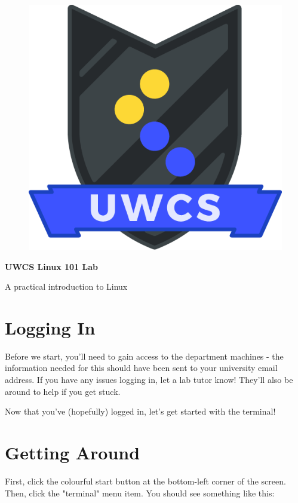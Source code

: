 \documentclass[a4paper,11pt,parskip=half-]{scrartcl}
\begin{document}
\begin{figure}
    \vspace{-10pt} %
    \includegraphics[width=0.9\linewidth]{shield.png}
    \vspace{-100pt} %
\end{figure}

\normalfont \Huge \bfseries UWCS Linux 101 Lab

\normalfont\LARGE A practical introduction to Linux
\normalsize

\section*{Logging In}

Before we start, you'll need to gain access to the department machines - the information needed for this should have been sent to your university email address. 
If you have any issues logging in, let a lab tutor know! 
They'll also be around to help if you get stuck. 

Now that you've (hopefully) logged in, let's get started with the terminal!

\section*{Getting Around}

First, click the colourful start button at the bottom-left corner of the screen. \\
Then, click the "terminal" menu item. You should see something like this:
\end{document}
